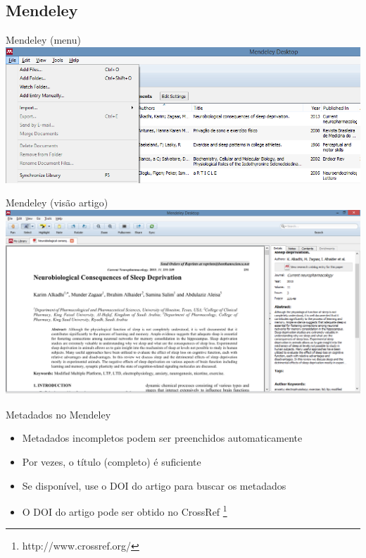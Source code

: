 \documentclass{beamer}
\begin{document}
\subsection{Mendeley}

\begin{frame}{Mendeley (menu)}
  \includegraphics[width=1.2\textwidth]{Referencias/mendeley-menu}
\end{frame}

\begin{frame}{Mendeley (visão artigo)}
  \includegraphics[width=1.2\textwidth]{Referencias/mendeley-artigo}
\end{frame}

\begin{frame}{Metadados no Mendeley}
  \begin{itemize}
  \item Metadados incompletos podem ser preenchidos automaticamente
  \item Por vezes, o título (completo) é suficiente
  \item Se disponível, use o DOI do artigo para buscar os metadados
  \item O DOI do artigo pode ser obtido no CrossRef
    \footnote{http://www.crossref.org/}
  \end{itemize}
\end{frame}
\end{document}
